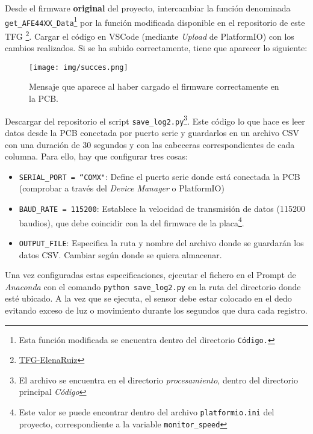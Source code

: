 Desde el firmware \textbf{original} del proyecto, intercambiar la función denominada \texttt{get\_AFE44XX\_Data}\footnote{Esta función modificada se encuentra dentro del directorio \texttt{Código.}} por la función modificada disponible en el repositorio de este TFG \footnote{\href{https://github.com/ElenaRuizMoreno/TFG-Elena-Ruiz/}{TFG-ElenaRuiz}}. Cargar el código en VSCode (mediante \textit{Upload} de PlatformIO) con los cambios realizados. Si se ha subido correctamente, tiene que aparecer lo siguiente:

\begin{figure}[H]
    \centering
    \texttt{[image: img/succes.png]}
    \caption{Mensaje que aparece al haber cargado el firmware correctamente en la PCB.}
    \label{fig:success}
\end{figure}


Descargar del repositorio el script \texttt{save\_log2.py}\footnote{El archivo se encuentra en el directorio \textit{procesamiento}, dentro del directorio principal \textit{Código}}. Este código lo que hace es leer datos desde la PCB conectada por puerto serie y guardarlos en un archivo CSV con una duración de 30 segundos y con las cabeceras correspondientes de cada columna. Para ello, hay que configurar tres cosas:

\begin{itemize}
    \item \texttt{SERIAL\_PORT = ``COMX"}: Define el puerto serie donde está conectada la PCB (comprobar a través del \textit{Device Manager} o PlatformIO)
    \item \texttt{BAUD\_RATE = 115200}: Establece la velocidad de transmisión de datos (115200 baudios), que debe coincidir con la del firmware de la placa\footnote{Este valor se puede encontrar dentro del archivo \texttt{platformio.ini} del proyecto, correspondiente a la variable \texttt{monitor\_speed}}.
    \item \texttt{OUTPUT\_FILE}: Especifica la ruta y nombre del archivo donde se guardarán los datos CSV. Cambiar según donde se quiera almacenar.
\end{itemize}

Una vez configuradas estas especificaciones, ejecutar el fichero en el Prompt de \textit{Anaconda} con el comando \texttt{python save\_log2.py} en la ruta del directorio donde esté ubicado. A la vez que se ejecuta, el sensor debe estar colocado en el dedo evitando exceso de luz o movimiento durante los segundos que dura cada registro. 

